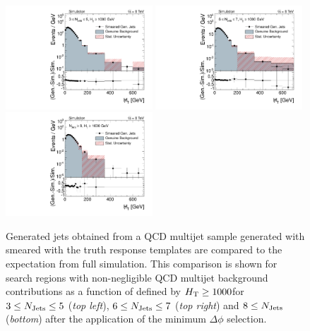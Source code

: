 \begin{description}
\begin{figure}[!t]
  \begin{minipage}[c]{1.\textwidth}
    \begin{center}
      \includegraphics[width=0.49\textwidth]{figures/MHT_JetBin2_HThigh_madgraph_DR53X_chs_withoutPUReweighting_SmearedGenJets_v1.pdf}%
      \includegraphics[width=0.49\textwidth]{figures/MHT_JetBin3_HThigh_madgraph_DR53X_chs_withoutPUReweighting_SmearedGenJets_v1.pdf}\\ 
      \includegraphics[width=0.49\textwidth]{figures/MHT_JetBin4_HThigh_madgraph_DR53X_chs_withoutPUReweighting_SmearedGenJets_v1.pdf}
    \end{center}
  \end{minipage}
  \caption{Generated jets obtained from a QCD multijet sample generated with \madgraph smeared with the truth response templates are compared to the expectation from full simulation. This comparison is shown for search regions with non-negligible QCD multijet background contributions as a function of \MHT defined by $H_{\text{T}} \ge 1000$\gev for $3 \le N_{\text{Jets}} \le 5$ (\textit{top left}), $6 \le N_{\text{Jets}} \le 7$ (\textit{top right}) and $8 \le N_{\text{Jets}}$ (\textit{bottom}) after the application of the minimum $\Delta \phi$ selection.}

\end{figure}
\end{description}

